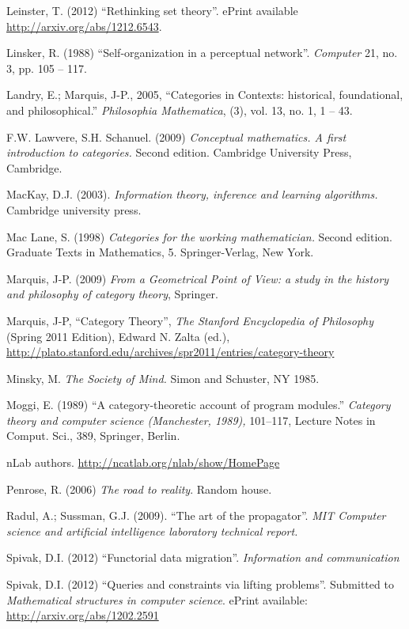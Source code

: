 \documentclass[a4paper]{book}
\theoremstyle{myth}
\begin{document}
\begin{russian}
\begin{thebibliography}{SGWB}
 Leinster, T. (2012) “Rethinking set theory”. ePrint available \url{http://arxiv.org/abs/1212.6543}.

 Linsker, R. (1988) “Self-organization in a perceptual network”. {\em Computer} 21, no. 3, pp. 105 -- 117.

 Landry, E.; Marquis, J-P., 2005, “Categories in Contexts: historical, foundational, and philosophical.” {\em Philosophia Mathematica}, (3), vol. 13, no. 1, 1 -- 43.

 F.W. Lawvere, S.H. Schanuel. (2009) {\em Conceptual mathematics. 
A first introduction to categories.} Second edition. Cambridge University Press, Cambridge.

 MacKay, D.J. (2003). {\em Information theory, inference and learning algorithms.} Cambridge university press.

 Mac Lane, S. (1998) {\em Categories for the working mathematician.} Second edition. Graduate Texts in Mathematics, 5. Springer-Verlag, New York.

 Marquis, J-P. (2009) {\em From a Geometrical Point of View: a study in the history and philosophy of category theory}, Springer.

 Marquis, J-P, “Category Theory”, {\em The Stanford Encyclopedia of Philosophy} (Spring 2011 Edition), Edward N. Zalta (ed.), \url{http://plato.stanford.edu/archives/spr2011/entries/category-theory}

 Minsky, M. {\em The Society of Mind.}  Simon and Schuster, NY 1985.

 Moggi, E. (1989) “A category-theoretic account of program modules.” {\em Category theory and computer science (Manchester, 1989),} 101–117, Lecture Notes in Comput. Sci., 389, Springer, Berlin. 

 nLab authors.  \url{http://ncatlab.org/nlab/show/HomePage}

 Penrose, R. (2006) {\em The road to reality}. Random house.

 Radul, A.; Sussman, G.J. (2009). “The art of the propagator”. {\em MIT Computer science and artificial intelligence laboratory technical report.}

 Spivak, D.I. (2012) “Functorial data migration”. {\em Information and communication} 

 Spivak, D.I. (2012) “Queries and constraints via lifting problems”. Submitted to {\em Mathematical structures in computer science}. ePrint available: \url{http://arxiv.org/abs/1202.2591}


\end{thebibliography}
\end{russian}
\end{document}
